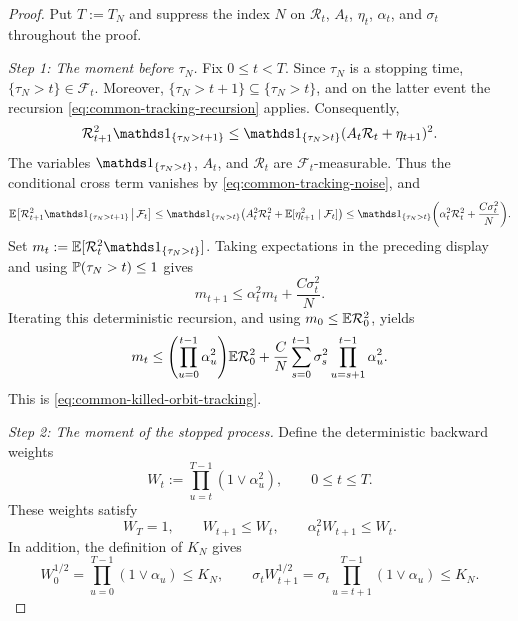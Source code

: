 \documentclass[11pt,reqno,a4paper]{article}
\newcommand{\Pp}{\P}
\newcommand{\Ee}{\E}
\begin{document}
\begin{proof}
  Put $T:=T_N$ and suppress the index $N$ on $\mathcal R_t$, $A_t$,
  $\eta_t$, $\alpha_t$, and $\sigma_t$ throughout the proof.

  \emph{Step 1: The moment before $\tau_N$.}
  Fix $0\leq t<T$. Since $\tau_N$ is a stopping time,
  $\{\tau_N>t\}\in\mathcal F_t$. Moreover,
  $\{\tau_N>t+1\}\subseteq\{\tau_N>t\}$, and on the latter event the
  recursion \cref{eq:common-tracking-recursion} applies. Consequently,
  \begin{equation*}
    \mathcal R_{t+1}^2\one_{\{\tau_N>t+1\}}
    \leq
    \one_{\{\tau_N>t\}}
    (A_t\mathcal R_t+\eta_{t+1})^2.
  \end{equation*}
  The variables $\one_{\{\tau_N>t\}}$, $A_t$, and $\mathcal R_t$ are
  $\mathcal F_t$-measurable. Thus the conditional cross term vanishes by
  \cref{eq:common-tracking-noise}, and
  \begin{equation*}
    \Ee\left[
      \mathcal R_{t+1}^2\one_{\{\tau_N>t+1\}}
      \,\middle|\,\mathcal F_t
    \right]
    \leq
    \one_{\{\tau_N>t\}}
    \left(
      A_t^2\mathcal R_t^2
      +\Ee[\eta_{t+1}^2\mid\mathcal F_t]
    \right)
    \leq
    \one_{\{\tau_N>t\}}
    \left(
      \alpha_t^2\mathcal R_t^2
      +\frac{C\sigma_t^2}{N}
    \right).
  \end{equation*}
  Set
  $m_t:=\Ee[\mathcal R_t^2\one_{\{\tau_N>t\}}]$. Taking expectations in
  the preceding display and using $\Pp(\tau_N>t)\leq1$ gives
  \begin{equation*}
    m_{t+1}
    \leq
    \alpha_t^2m_t+\frac{C\sigma_t^2}{N}.
  \end{equation*}
  Iterating this deterministic recursion, and using
  $m_0\leq\Ee\mathcal R_0^2$, yields
  \begin{equation*}
    m_t
    \leq
    \left(\prod_{u=0}^{t-1}\alpha_u^2\right)
    \Ee\mathcal R_0^2
    +\frac{C}{N}\sum_{s=0}^{t-1}
    \sigma_s^2\prod_{u=s+1}^{t-1}\alpha_u^2.
  \end{equation*}
  This is \cref{eq:common-killed-orbit-tracking}.

  \emph{Step 2: The moment of the stopped process.}
  Define the deterministic backward weights
  \begin{equation*}
    W_t:=\prod_{u=t}^{T-1}(1\vee\alpha_u^2),
    \qquad 0\leq t\leq T.
  \end{equation*}
  These weights satisfy
  \begin{equation*}
    W_T=1,
    \qquad
    W_{t+1}\leq W_t,
    \qquad
    \alpha_t^2W_{t+1}\leq W_t.
  \end{equation*}
  In addition, the definition of $K_N$ gives
  \begin{equation*}
    W_0^{1/2}
    =\prod_{u=0}^{T-1}(1\vee\alpha_u)
    \leq K_N,
    \qquad
    \sigma_tW_{t+1}^{1/2}
    =\sigma_t\prod_{u=t+1}^{T-1}(1\vee\alpha_u)
    \leq K_N.
  \end{equation*}


\end{proof}
\end{document}
